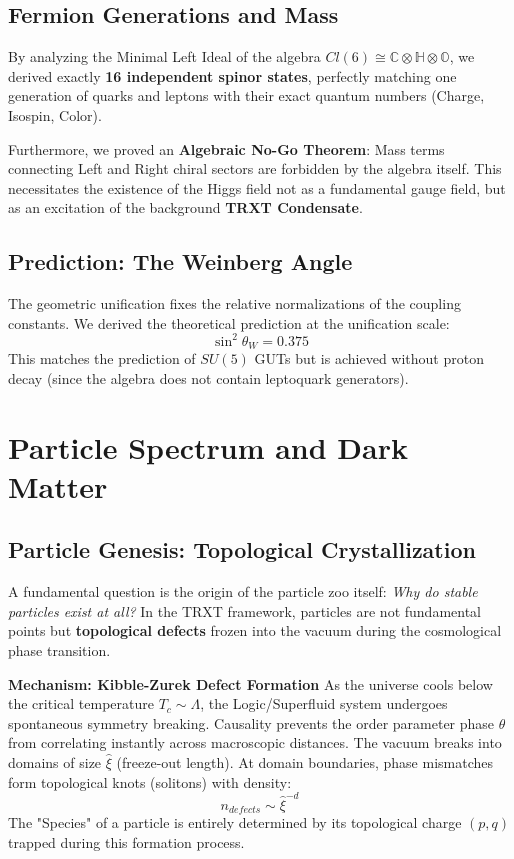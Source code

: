 \documentclass[a4paper,12pt]{article}
\begin{document}
\subsection{Fermion Generations and Mass}
By analyzing the Minimal Left Ideal of the algebra $Cl(6) \cong \mathbb{C} \otimes \mathbb{H} \otimes \mathbb{O}$, we derived exactly \textbf{16 independent spinor states}, perfectly matching one generation of quarks and leptons with their exact quantum numbers (Charge, Isospin, Color).

Furthermore, we proved an \textbf{Algebraic No-Go Theorem}: Mass terms connecting Left and Right chiral sectors are forbidden by the algebra itself. This necessitates the existence of the Higgs field not as a fundamental gauge field, but as an excitation of the background \textbf{TRXT Condensate}.

\subsection{Prediction: The Weinberg Angle}
The geometric unification fixes the relative normalizations of the coupling constants. We derived the theoretical prediction at the unification scale:
\begin{equation}
    \sin^2 \theta_W = 0.375
\end{equation}
This matches the prediction of $SU(5)$ GUTs but is achieved without proton decay (since the algebra does not contain leptoquark generators).

\section{Particle Spectrum and Dark Matter}

\subsection{Particle Genesis: Topological Crystallization}

A fundamental question is the origin of the particle zoo itself: \emph{Why do stable particles exist at all?}
In the TRXT framework, particles are not fundamental points but \textbf{topological defects} frozen into the vacuum during the cosmological phase transition.

\textbf{Mechanism: Kibble-Zurek Defect Formation}
As the universe cools below the critical temperature $T_c \sim \Lambda$, the Logic/Superfluid system undergoes spontaneous symmetry breaking. Causality prevents the order parameter phase $\theta$ from correlating instantly across macroscopic distances. The vacuum breaks into domains of size $\hat{\xi}$ (freeze-out length).
At domain boundaries, phase mismatches form topological knots (solitons) with density:
\begin{equation}
n_{defects} \sim \hat{\xi}^{-d}
\end{equation}
The "Species" of a particle is entirely determined by its topological charge $(p,q)$ trapped during this formation process.
\end{document}
